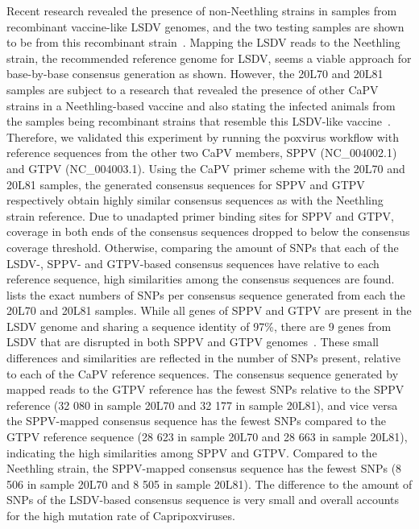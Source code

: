 Recent research revealed the presence of non-Neethling strains in samples from recombinant vaccine-like \ac{LSDV} genomes, and the two testing samples are shown to be from this recombinant strain~\cite{vandenbussche2022recombinant}. Mapping the \ac{LSDV} reads to the Neethling strain, the recommended reference genome for \ac{LSDV}, seems a viable approach for base-by-base consensus generation as shown. However, the 20L70 and 20L81 samples are subject to a research that revealed the presence of other \ac{CaPV} strains in a Neethling-based vaccine and also stating the infected animals from the samples being recombinant strains that resemble this \ac{LSDV}-like vaccine~\cite{vandenbussche2022recombinant}. Therefore, we validated this experiment by running the poxvirus workflow with reference sequences from the other two \ac{CaPV} members, \ac{SPPV} (NC\_004002.1) and \ac{GTPV} (NC\_004003.1). Using the \ac{CaPV} primer scheme with the 20L70 and 20L81 samples, the generated consensus sequences for \ac{SPPV} and \ac{GTPV} respectively obtain highly similar consensus sequences as with the Neethling strain reference. Due to unadapted primer binding sites for \ac{SPPV} and \ac{GTPV}, coverage in both ends of the consensus sequences dropped to below the consensus coverage threshold. Otherwise, comparing the amount of \acp{SNP} that each of the \ac{LSDV}-, \ac{SPPV}- and \ac{GTPV}-based consensus sequences have relative to each reference sequence, high similarities among the consensus sequences are found.  lists the exact numbers of \acp{SNP} per consensus sequence generated from each the 20L70 and 20L81 samples. While all genes of \ac{SPPV} and \ac{GTPV} are present in the \ac{LSDV} genome and sharing a sequence identity of 97\%, there are 9 genes from \ac{LSDV} that are disrupted in both \ac{SPPV} and \ac{GTPV} genomes~\cite{tulman2002genomes}. These small differences and similarities are reflected in the number of \acp{SNP} present, relative to each of the \ac{CaPV} reference sequences. The consensus sequence generated by mapped reads to the \ac{GTPV} reference has the fewest \acp{SNP} relative to the \ac{SPPV} reference (32 080 in sample 20L70 and 32 177 in sample 20L81), and vice versa the \ac{SPPV}-mapped consensus sequence has the fewest \acp{SNP} compared to the \ac{GTPV} reference sequence (28 623 in sample 20L70 and 28 663 in sample 20L81), indicating the high similarities among \ac{SPPV} and \ac{GTPV}. Compared to the Neethling strain, the \ac{SPPV}-mapped consensus sequence has the fewest \acp{SNP} (8 506 in sample 20L70 and 8 505 in sample 20L81). The difference to the amount of \acp{SNP} of the \ac{LSDV}-based consensus sequence is very small and overall accounts for the high mutation rate of Capripoxviruses.
\\

